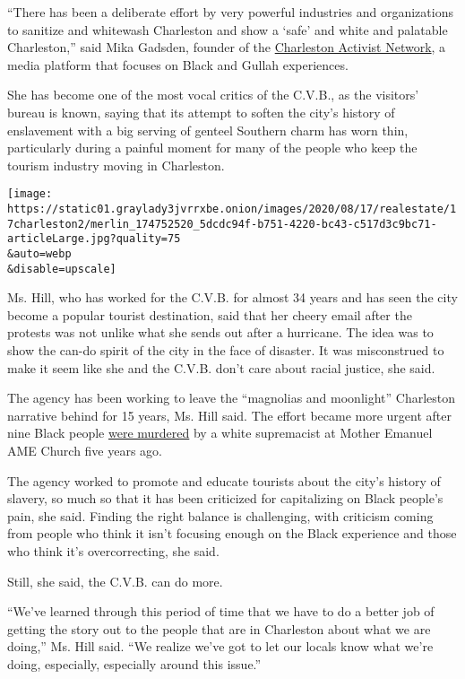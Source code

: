 ``There has been a deliberate effort by very powerful industries and
organizations to sanitize and whitewash Charleston and show a `safe' and
white and palatable Charleston,'' said Mika Gadsden, founder of the
\href{https://www.facebookcorewwwi.onion/CharlestonActivistNetwork/}{Charleston
Activist Network}, a media platform that focuses on Black and Gullah
experiences.

She has become one of the most vocal critics of the C.V.B., as the
visitors' bureau is known, saying that its attempt to soften the city's
history of enslavement with a big serving of genteel Southern charm has
worn thin, particularly during a painful moment for many of the people
who keep the tourism industry moving in Charleston.

\texttt{[image: https://static01.graylady3jvrrxbe.onion/images/2020/08/17/realestate/17charleston2/merlin\_174752520\_5dcdc94f-b751-4220-bc43-c517d3c9bc71-articleLarge.jpg?quality=75\\\&auto=webp\\\&disable=upscale]}

Ms. Hill, who has worked for the C.V.B. for almost 34 years and has seen
the city become a popular tourist destination, said that her cheery
email after the protests was not unlike what she sends out after a
hurricane. The idea was to show the can-do spirit of the city in the
face of disaster. It was misconstrued to make it seem like she and the
C.V.B. don't care about racial justice, she said.

The agency has been working to leave the ``magnolias and moonlight''
Charleston narrative behind for 15 years, Ms. Hill said. The effort
became more urgent after nine Black people
\href{https://www.nytimes3xbfgragh.onion/2015/06/18/us/church-attacked-in-charleston-south-carolina.html}{were
murdered} by a white supremacist at Mother Emanuel AME Church five years
ago.

The agency worked to promote and educate tourists about the city's
history of slavery, so much so that it has been criticized for
capitalizing on Black people's pain, she said. Finding the right balance
is challenging, with criticism coming from people who think it isn't
focusing enough on the Black experience and those who think it's
overcorrecting, she said.

Still, she said, the C.V.B. can do more.

``We've learned through this period of time that we have to do a better
job of getting the story out to the people that are in Charleston about
what we are doing,'' Ms. Hill said. ``We realize we've got to let our
locals know what we're doing, especially, especially around this
issue.''

